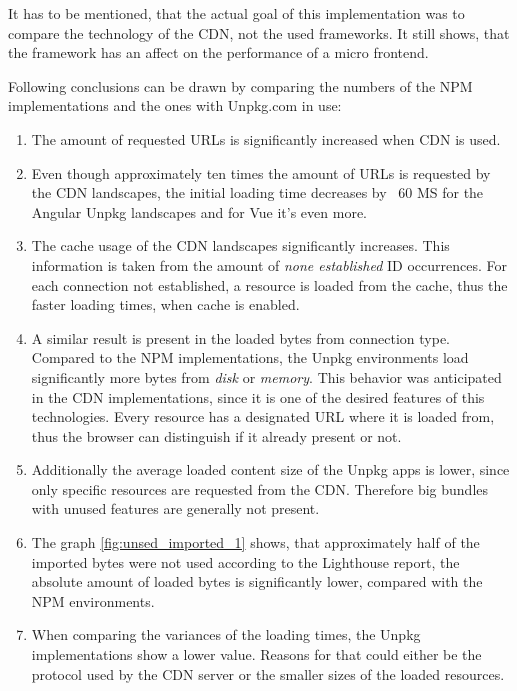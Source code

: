 It has to be mentioned, that the actual goal of this implementation was to compare the technology of the CDN, not the used frameworks. It still shows, that the framework has an affect on the performance of a micro frontend. 

Following conclusions can be drawn by comparing the numbers of the NPM implementations and the ones with Unpkg.com in use:

\begin{enumerate}
	\item The amount of requested URLs is significantly increased when CDN is used.
	\item Even though approximately ten times the amount of URLs is requested by the CDN landscapes, the initial loading time decreases by ~60 MS for the Angular Unpkg landscapes and for Vue it's even more.
	\item The cache usage of the CDN landscapes significantly increases. This information is taken from the amount of \textit{none established} ID occurrences. For each connection not established, a resource is loaded from the cache, thus the faster loading times, when cache is enabled.
	\item A similar result is present in the loaded bytes from connection type. Compared to the NPM implementations, the Unpkg environments load significantly more bytes from \textit{disk} or \textit{memory}. This behavior was anticipated in the CDN implementations, since it is one of the desired features of this technologies. Every resource has a designated URL where it is loaded from, thus the browser can distinguish if it already present or not.
	\item Additionally the average loaded content size of the Unpkg apps is lower, since only specific resources are requested from the CDN. Therefore big bundles with unused features are generally not present.
	\item The graph \ref{fig:unsed_imported_1} shows, that approximately half of the imported bytes were not used according to the Lighthouse report, the absolute amount of loaded bytes is significantly lower, compared with the NPM environments.
	\item When comparing the variances of the loading times, the Unpkg implementations show a lower value. Reasons for that could either be the protocol used by the CDN server or the smaller sizes of the loaded resources.
\end{enumerate}

